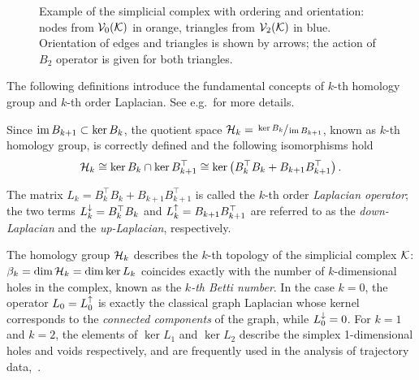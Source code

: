 \documentclass{mynotes}
\begin{document}
\begin{figure}[hbtp]
      \caption{ Example of the simplicial complex with ordering and orientation: nodes from \( \mathcal{V}_{0}(\mathcal{K}) \) in orange, triangles from \( \mathcal{V}_{2}(\mathcal{K}) \) in blue. Orientation of edges and triangles is shown by arrows; the action of \( B_2 \) operator is given for both triangles.\label{fig:orientation}}
\end{figure}


The following definitions introduce the fundamental concepts of $k$-th homology group and $k$-th order Laplacian.  See \cite{Lim15} e.g.\ for more details. 

\begin{definition}
      Since \( \operatorname{im} B_{k+1} \subset \ker B_k \), the quotient space \( \mathcal{H}_k =  \sfrac{ \ker B_k }{ \operatorname{im} B_{k+1}} \), known as \( k\)-th homology group, is correctly defined and the following isomorphisms hold 
    \begin{equation*}
            \mathcal{H}_k \cong \ker B_k \cap \ker B_{k+1}^\top \cong \ker \left( B_k^\top B_k + B_{k+1} B_{k+1}^\top \right).
      \end{equation*}

      The matrix \( L_k = B_k^\top B_k + B_{k+1} B_{k+1}^\top \) is called the \(k\)-th order \emph{Laplacian operator}; the two terms \( L_{k}^{\downarrow} =  B_k^\top B_k \) and \( L_{k}^{\uparrow} = B_{k+1} B_{k+1}^\top \) are referred to as the \emph{down-Laplacian} and the \emph{up-Laplacian}, respectively.
\end{definition}

The homology group \( \mathcal{H}_k \) describes the \(k\)-th topology of the simplicial complex \( \mathcal{K} \): \( \beta_k = \dim \mathcal{H}_k = \dim \ker L_k \)  coincides exactly with the number of \(k\)-dimensional holes in the complex, known as the \emph{ \(k\)-th Betti number}. In the case \( k = 0 \), the operator \( L_0 = L_{0}^{\uparrow}\) is exactly the classical graph Laplacian whose kernel corresponds to the \textit{connected components} of the graph, while \( L_{0}^{\downarrow}  = 0 \). For \( k = 1 \) and \( k = 2\), the elements of \( \ker L_1 \) and \( \ker L_2\) describe the simplex 1-dimensional holes and voids respectively, and are frequently used in the analysis of trajectory data,~\cite{schaub2019random,benson2016higher}.
\end{document}
